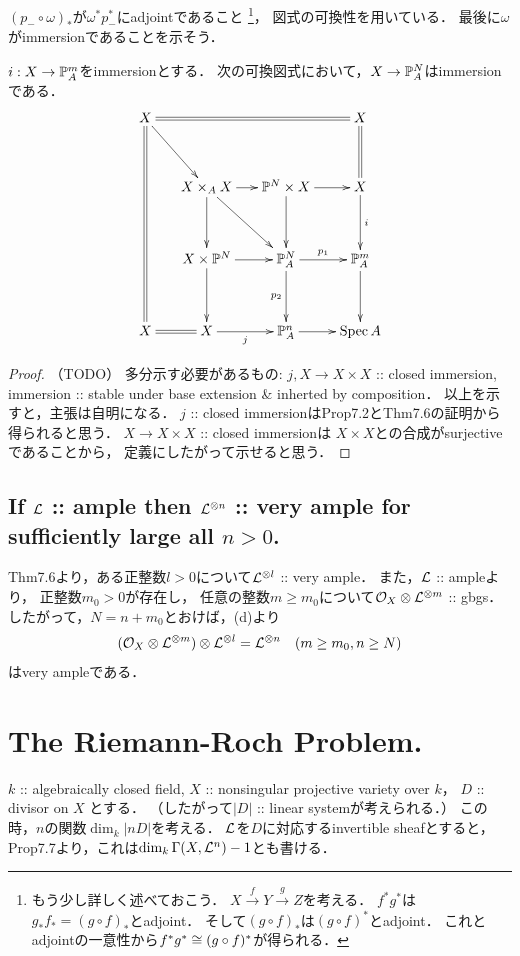 \documentclass[a4paper]{jsarticle}
\begin{document}
    $(p_{-} \circ \omega)_*$が$\omega^* p_{-}^*$にadjointであること
    \footnote
        {
            もう少し詳しく述べておこう．
            $X \xrightarrow{f} Y \xrightarrow{g} Z$を考える．
            $f^* g^*$は$g_* f_*=(g \circ f)_*$とadjoint．
            そして$(g \circ f)_*$は$(g \circ f)^*$とadjoint．
            これとadjointの一意性から$f^* g^* \cong (g \circ f)^*$が得られる．
        }，
    図式の可換性を用いている．
    最後に$\omega$がimmersionであることを示そう．
    \begin{Claim}
        $i: X \to \mathbb{P}^m_A$をimmersionとする．
        次の可換図式において，$X \to \mathbb{P}^N_A$はimmersionである．
        \[
        \xymatrix@R=35pt@C=15pt
        {
            X \ar@{=}[rrr]\ar@{=}[ddd]\ar[rd]& {} & {} &  X \ar@{=}[d]\\
            {} & X \times_A X \ar[rd] \ar[r]\ar[d]& \proj^N \times X \ar[r]\ar[d]&  X \ar[d]^-{i} \\
            {} & X \times \proj^N \ar[d]\ar[r]& \proj^{N}_A \ar[r]^-{p_1}\ar[d]_-{p_2}& \proj^m_A \ar[d] \\
            X \ar@{=}[r]& X \ar[r]_-{j}& \proj^n_A \ar[r]& \Spec A
        }
        \]
    \end{Claim}
    \begin{proof}
        （TODO）
        多分示す必要があるもの:
        $j, X \to X \times X$ :: closed immersion,
        immersion :: stable under base extension \& inherted by composition．
        以上を示すと，主張は自明になる．
        $j$ :: closed immersionはProp7.2とThm7.6の証明から得られると思う．
        $X \to X \times X$ :: closed immersionは
        $X \times X$との合成がsurjectiveであることから，
        定義にしたがって示せると思う．
    \end{proof}

    \subsection{If $\mathcal{L}$ :: ample then $\mathcal{L}^{\otimes n}$ :: very ample for sufficiently large all $n>0$.}
    Thm7.6より，ある正整数$l>0$について$\mathcal{L}^{\otimes l}$ :: very ample．
    また，$\mathcal{L}$ :: ampleより，
    正整数$m_0>0$が存在し，
    任意の整数$m \geq m_0$について$\mathcal{O}_X \otimes \mathcal{L}^{\otimes m}$ :: gbgs．
    したがって，$N=n+m_0$とおけば，(d)より
    \[ (\mathcal{O}_X \otimes \mathcal{L}^{\otimes m}) \otimes \mathcal{L}^{\otimes l}=\mathcal{L}^{\otimes n} ~~~ (m \geq m_0, n \geq N) \]
    はvery ampleである．

\section{The Riemann-Roch Problem.} %
    $k$ :: algebraically closed field,
    $X$ :: nonsingular projective variety over $k$，
    $D$ :: divisor on $X$
    とする．
    （したがって$|D|$ :: linear systemが考えられる．）
    この時，$n$の関数$\dim_k |nD|$を考える．
    $\mathcal{L}$を$D$に対応するinvertible sheafとすると，
    Prop7.7より，これは$\dim_k \Gamma(X, \mathcal{L}^n)-1$とも書ける．
\end{document}
